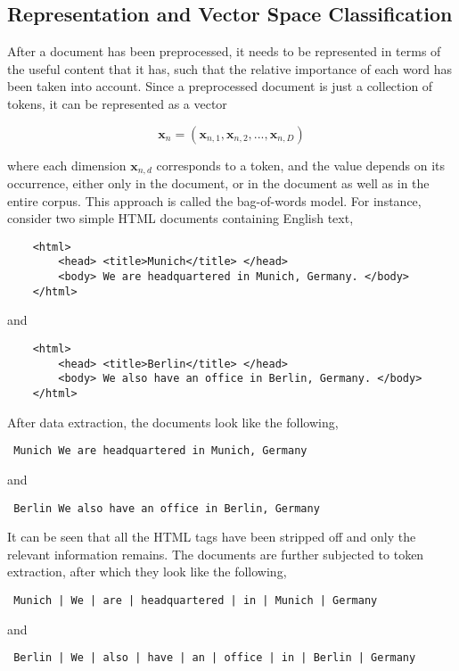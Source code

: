 \subsection{Representation and Vector Space Classification}
After a document has been preprocessed, it needs to be represented in terms of the useful content that it has, such that the relative importance of each word has been taken into account. Since a preprocessed document is just a collection of tokens, it can be represented as a vector

$$\mathbf{x}_{n} = (\mathbf{x}_{n, 1}, \mathbf{x}_{n, 2}, ... , \mathbf{x}_{n, D})$$

where each dimension $\mathbf{x}_{n, d}$ corresponds to a token, and the value depends on its occurrence, either only in the document, or in the document as well as in the entire corpus. This approach is called the bag-of-words model. For instance, consider two simple HTML documents containing English text,

\begin{center}
    \begin{verbatim}
    <html>
        <head> <title>Munich</title> </head>
        <body> We are headquartered in Munich, Germany. </body>
    </html>
    \end{verbatim}
    and
    \begin{verbatim}
    <html>
        <head> <title>Berlin</title> </head>
        <body> We also have an office in Berlin, Germany. </body>
    </html>
    \end{verbatim}
\end{center}

After data extraction, the documents look like the following,

\begin{center}
    \begin{verbatim} Munich We are headquartered in Munich, Germany \end{verbatim}
    and
    \begin{verbatim} Berlin We also have an office in Berlin, Germany \end{verbatim}
\end{center}

It can be seen that all the HTML tags have been stripped off and only the relevant information remains. The documents are further subjected to token extraction, after which they look like the following,

\begin{center}
    \begin{verbatim} Munich | We | are | headquartered | in | Munich | Germany \end{verbatim}
    and
    \begin{verbatim} Berlin | We | also | have | an | office | in | Berlin | Germany \end{verbatim}
\end{center}

